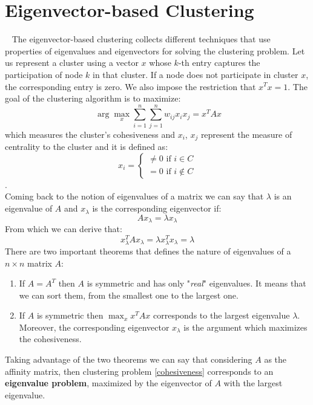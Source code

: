 \section{Eigenvector-based Clustering}~\label{eingenvector-based-clustering}
The eigenvector-based clustering collects different techniques that use properties of eigenvalues and eigenvectors for solving the clustering problem.
Let us represent a cluster using a vector $x$ whose $k$-th entry captures the participation of node $k$ in that cluster. If a node does not participate in cluster $x$, the corresponding entry is zero. We also impose the restriction that $x^Tx = 1$. The goal of the clustering algorithm is to maximize:
\begin{equation}~\label{cohesiveness}
\arg\max_x \sum_{i=1}^n \sum_{j=1}^n w_{ij} x_i x_j = x^TAx
\end{equation}
which measures the cluster's cohesiveness and $x_i$, $x_j$ represent the measure of centrality to the cluster and it is defined as:
$$x_i = \begin{cases}
\neq 0 \text{  if } i \in C\\
= 0 \text{  if } i \notin C
\end{cases}$$.\\
Coming back to the notion of eigenvalues of a matrix we can say that $\lambda$ is an eigenvalue of $A$ and $x_\lambda$ is the corresponding eigenvector if:
$$Ax_\lambda = \lambda x_\lambda$$
From which we can derive that:
$$x_\lambda^TAx_\lambda = \lambda x_\lambda^Tx_\lambda = \lambda$$
There are two important theorems that defines the nature of eigenvalues of a $n\times n$ matrix $A$:
\begin{enumerate}
	\item If $A = A^T$ then $A$ is symmetric and has only "\textit{real}" eigenvalues. It means that we can sort them, from the smallest one to the largest one.
	\item If $A$ is symmetric then $\max_x x^TAx$ corresponds to the largest eigenvalue $\lambda$. Moreover, the corresponding eigenvector $x_\lambda$ is the argument which maximizes the cohesiveness.
\end{enumerate}
Taking advantage of the two theorems we can say that considering $A$ as the affinity matrix, then clustering problem \ref{cohesiveness} corresponds to an \textbf{eigenvalue problem}, maximized by the eigenvector of $A$ with the largest eigenvalue.\\

